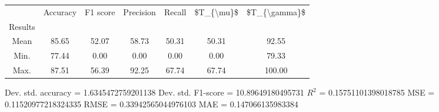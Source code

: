 \begin{tabular}{|c|c|c|c|c|c|c|}
\toprule
{} &  Accuracy &  F1 score &  Precision &  Recall &  \$T\_\{\textbackslash mu\}\$ &  \$T\_\{\textbackslash gamma\}\$ \\
Results &           &           &            &         &            &               \\
\hline
Mean    &     85.65 &     52.07 &      58.73 &   50.31 &      50.31 &         92.55 \\
Min.    &     77.44 &      0.00 &       0.00 &    0.00 &       0.00 &         79.33 \\
Max.    &     87.51 &     56.39 &      92.25 &   67.74 &      67.74 &        100.00 \\
\bottomrule
\end{tabular}

 Dev. std. accuracy = 1.6345472759201138
 Dev. std. F1-score = 10.89649180495731
 $R^2$ = 0.15751101398018785
 MSE = 0.11520977218324335
 RMSE = 0.33942565044976103
 MAE = 0.147066135983384